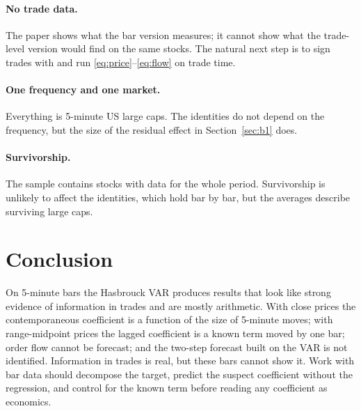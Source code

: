 \documentclass[11pt,a4paper]{article}
\begin{document}
\paragraph{No trade data.} The paper shows what the bar version measures; it cannot show what the
trade-level version would find on the same stocks. The natural next step is to sign trades with
\citet{lee1991} and run \eqref{eq:price}--\eqref{eq:flow} on trade time.

\paragraph{One frequency and one market.} Everything is 5-minute US large caps. The identities do not
depend on the frequency, but the size of the residual effect in Section~\ref{sec:b1} does.

\paragraph{Survivorship.} The sample contains stocks with data for the whole period. Survivorship is unlikely to affect the identities, which hold bar by bar, but the averages describe surviving large caps.

\section{Conclusion}

On 5-minute bars the Hasbrouck VAR produces results that look like strong evidence of information in
trades and are mostly arithmetic. With close prices the contemporaneous coefficient is a function of the
size of 5-minute moves; with range-midpoint prices the lagged coefficient is a known term moved by one
bar; order flow cannot be forecast; and the two-step forecast built on the VAR is not identified.
Information in trades is real, but these bars cannot show it. Work with bar data should decompose the
target, predict the suspect coefficient without the regression, and control for the known term before
reading any coefficient as economics.
\end{document}
